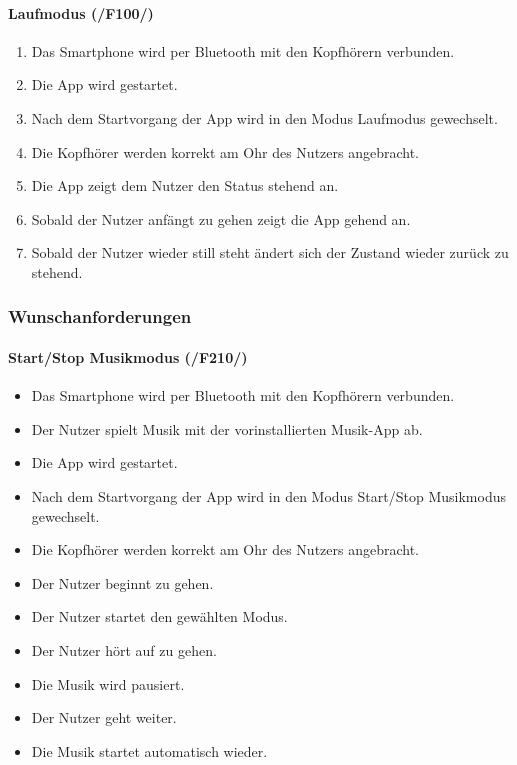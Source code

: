 \documentclass[a4paper,12pt]{article}
\begin{document}
  \paragraph{Laufmodus (/F100/)}
  \begin{enumerate}
    \item Das Smartphone wird per Bluetooth mit den Kopfhörern verbunden.
    \item Die App wird gestartet.
    \item Nach dem Startvorgang der App wird in den Modus \glqq Laufmodus\grqq{} gewechselt.
    \item Die Kopfhörer werden korrekt am Ohr des Nutzers angebracht.
    \item Die App zeigt dem Nutzer den Status \glqq stehend\grqq{} an.
    \item Sobald der Nutzer anfängt zu gehen zeigt die App \glqq gehend\grqq{} an.
    \item Sobald der Nutzer wieder still steht ändert sich der Zustand wieder zurück zu \glqq stehend\grqq. 
  \end{enumerate}

  \subsubsection{Wunschanforderungen}
  \paragraph{Start/Stop Musikmodus (/F210/)}
  \begin{itemize}
    \item[] Das Smartphone wird per Bluetooth mit den Kopfhörern verbunden.
    \item[] Der Nutzer spielt Musik mit der vorinstallierten Musik-App ab.
    \item[] Die App wird gestartet.
    \item[] Nach dem Startvorgang der App wird in den Modus \glqq Start/Stop Musikmodus\grqq{} gewechselt.
    \item[] Die Kopfhörer werden korrekt am Ohr des Nutzers angebracht.
    \item[] Der Nutzer beginnt zu gehen.
    \item[] Der Nutzer startet den gewählten Modus.
    \item[] Der Nutzer hört auf zu gehen.
    \item[] Die Musik wird pausiert.
    \item[] Der Nutzer geht weiter.
    \item[] Die Musik startet automatisch wieder.
  \end{itemize}
  
\end{document}

